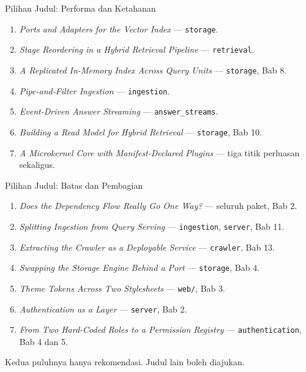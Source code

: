 \documentclass[aspectratio=169, table, 12pt]{beamer}
\begin{document}
\begin{frame}{{\Large Pilihan Judul: Performa dan Ketahanan}}
  \vspace{8pt}
  \begin{enumerate}\small
    \setcounter{enumi}{6}
    \item \textit{Ports and Adapters for the Vector Index} — \texttt{storage}.
    \item \textit{Stage Reordering in a Hybrid Retrieval Pipeline} —
          \texttt{retrieval}.
    \item \textit{A Replicated In-Memory Index Across Query Units} —
          \texttt{storage}, Bab 8.
    \item \textit{Pipe-and-Filter Ingestion} — \texttt{ingestion}.
    \item \textit{Event-Driven Answer Streaming} —
          \texttt{answer\_streams}.
    \item \textit{Building a Read Model for Hybrid Retrieval} —
          \texttt{storage}, Bab 10.
    \item \textit{A Microkernel Core with Manifest-Declared Plugins} — tiga
          titik perluasan sekaligus.
  \end{enumerate}
\end{frame}

\begin{frame}{{\Large Pilihan Judul: Batas dan Pembagian}}
  \vspace{8pt}
  \begin{enumerate}\small
    \setcounter{enumi}{13}
    \item \textit{Does the Dependency Flow Really Go One Way?} — seluruh
          paket, Bab 2.
    \item \textit{Splitting Ingestion from Query Serving} —
          \texttt{ingestion}, \texttt{server}, Bab 11.
    \item \textit{Extracting the Crawler as a Deployable Service} —
          \texttt{crawler}, Bab 13.
    \item \textit{Swapping the Storage Engine Behind a Port} —
          \texttt{storage}, Bab 4.
    \item \textit{Theme Tokens Across Two Stylesheets} — \texttt{web/},
          Bab 3.
    \item \textit{Authentication as a Layer} — \texttt{server}, Bab 2.
    \item \textit{From Two Hard-Coded Roles to a Permission Registry} —
          \texttt{authentication}, Bab 4 dan 5.
  \end{enumerate}

  \vspace{4pt}
  {\small Kedua puluhnya hanya rekomendasi. Judul lain boleh diajukan.}
\end{frame}
\end{document}

